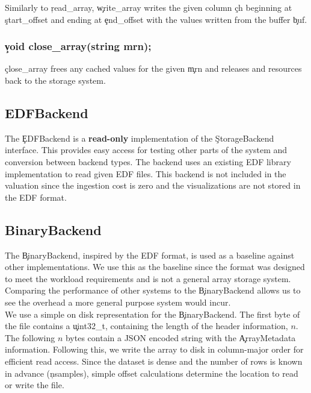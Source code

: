 Similarly to \c{read\_array}, \c{write\_array} writes the given column \c{ch}
beginning at \c{start\_offset} and ending at \c{end\_offset} with the values
written from the buffer \c{buf}.

\subsubsection{\c{void close\_array(string mrn);}}

\c{close\_array} frees any cached values for the given \c{mrn} and releases
and resources back to the storage system.

\subsection{EDFBackend}

The \c{EDFBackend} is a \textbf{read-only} implementation of the \c{StorageBackend}
interface. This provides easy access for testing other parts of the system and
conversion between backend types. The backend uses an existing EDF library
implementation \cite{edflib} to read given EDF files. This backend is not
included in the valuation since the ingestion cost is zero and the
visualizations are not stored in the EDF format.

\subsection{BinaryBackend}\label{storage-ch:implementation-binary}

The \c{BinaryBackend}, inspired by the EDF format, is used as a baseline
against other implementations. We use this as the baseline since the format was
designed to meet the workload requirements and is not a general array storage
system. Comparing the performance of other systems to the \c{BinaryBackend}
allows us to see the overhead a more general purpose system would incur. \\

We use a simple on disk representation for the \c{BinaryBackend}. The first
byte of the file contains a \c{uint32\_t}, containing the length of the header
information, $n$. The following $n$ bytes contain a JSON encoded string with
the \c{ArrayMetadata} information. Following this, we write the array to disk
in column-major order for efficient read access. Since the dataset is dense and
the number of rows is known in advance (\c{nsamples}), simple offset
calculations determine the location to read or write the file. \\


